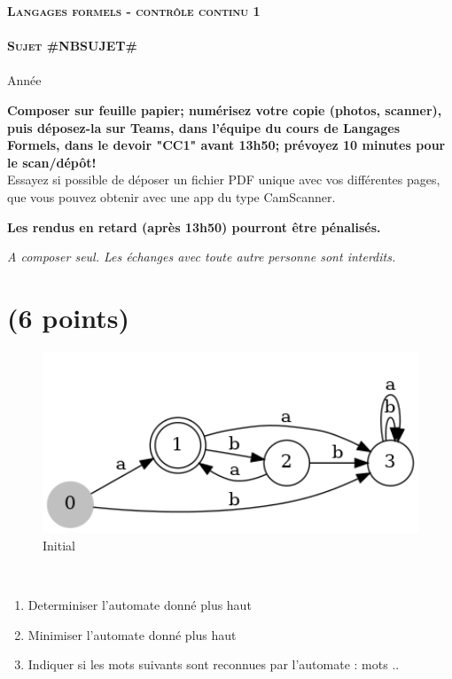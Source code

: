 \documentclass[]{article}
\begin{document}
    \begin{center}
    {\Large \textbf{\textsc{Langages formels - contrôle continu 1}}}
        \\
        ~\\
        {\Huge \textbf{\textsc{Sujet #NBSUJET#}}}\\
        ~\\
        Année \the\year
    \end{center}

    \vskip 5mm
    \textbf{Composer sur feuille papier; numérisez votre copie (photos, scanner), puis déposez-la sur Teams, dans l'équipe du cours de Langages Formels, dans le devoir "CC1" avant 13h50; prévoyez 10 minutes pour le scan/dépôt!} \\

    Essayez si possible de déposer un fichier PDF unique avec vos différentes pages, que vous pouvez obtenir avec une app du type CamScanner.


    \textbf{Les rendus en retard (après 13h50) pourront être pénalisés.}


    \emph{A composer seul. Les échanges avec toute autre personne sont interdits.}\\


    \section{(6 points)}
    \begin{figure}[htbp]
        \centering
        \includegraphics[width=15cm]{automateInitial.png}
        \caption{Initial}\label{fig:3.1}
    \end{figure}\

    \begin{enumerate}
        \item  Determiniser l'automate donné plus haut

        \item Minimiser l'automate donné plus haut

        \item Indiquer si les mots suivants sont reconnues par l'automate : {mots ..}

    \end{enumerate}
\end{document}
